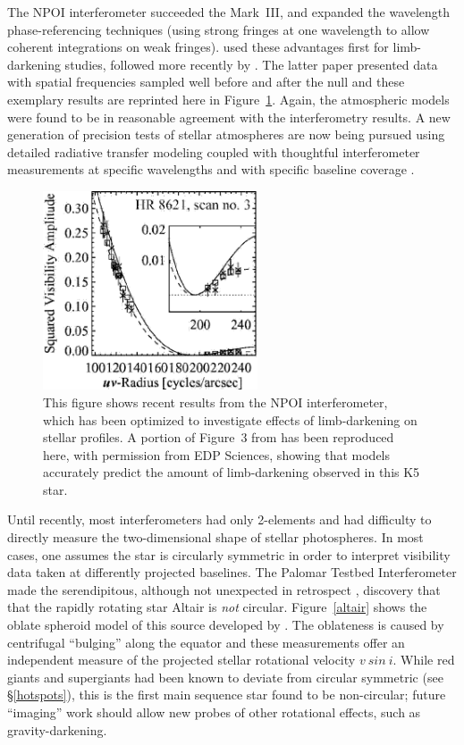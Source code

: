 \documentclass[12pt]{article}
\begin{document}
The NPOI interferometer succeeded the Mark~III, and expanded the
wavelength phase-referencing techniques (using strong fringes at one
wavelength to allow coherent integrations on weak fringes).
\citet{hajian1998} used these advantages first for limb-darkening
studies, followed more recently by \citet{wittkowski2001}. The latter
paper presented data with spatial frequencies sampled well before and
after the null and these exemplary results are reprinted here in
Figure~\ref{limbdarkening}.  Again, the atmospheric models were found
to be in reasonable agreement with the interferometry results. A new
generation of precision tests of stellar atmospheres are now being pursued
using detailed radiative transfer modeling coupled with thoughtful
interferometer measurements at specific wavelengths and with specific
baseline coverage \citep[e.g.,][]{aufdenberg2002}.

\begin{figure}[tbhp]
\begin{center}
\includegraphics[clip,angle=0,width=2.5in]{Figures/JDM_wittkowski2001.eps}
\caption{\footnotesize This figure shows recent results from the
  NPOI interferometer, which has been optimized to investigate effects
  of limb-darkening on stellar profiles.  A portion of Figure~3 from
  \citet{wittkowski2001} has been reproduced here, with permission
  from EDP Sciences, showing that models accurately predict the
  amount of limb-darkening observed in this K5 star.
\label{limbdarkening}}
\end{center}
\end{figure}

Until recently, most interferometers had only 2-elements and had
difficulty to directly measure the two-dimensional shape of stellar
photospheres. In most cases, one assumes the star is circularly
symmetric in order to interpret visibility data taken at differently
projected baselines.  The Palomar Testbed Interferometer made the
serendipitous, although not unexpected in retrospect
\citep{hanburybrown1967}, discovery that that the rapidly rotating
star Altair is {\em not} circular.  Figure~\ref{altair} shows the
oblate spheroid model of this source developed by
\citet{vanbelle2001}. The oblateness is caused by centrifugal
``bulging'' along the equator and these measurements offer an
independent measure of the projected stellar rotational velocity
$v~sin~i$.  While red giants and supergiants had been known to deviate
from circular symmetric (see \S\ref{hotspots}), this is the first main
sequence star found to be non-circular; future ``imaging'' work should
allow new probes of other rotational effects, such as
gravity-darkening.
\end{document}

